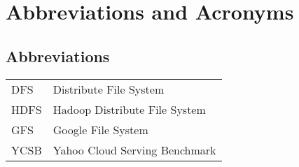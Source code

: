 \chapter*{Abbreviations and Acronyms}



\section*{Abbreviations}

\begin{tabular}{ll}
DFS	   	& Distribute File System \\
HDFS         & Hadoop Distribute File System \\
GFS		 & Google File System \\
YCSB	 & Yahoo Cloud Serving Benchmark
\end{tabular}
\clearpage
